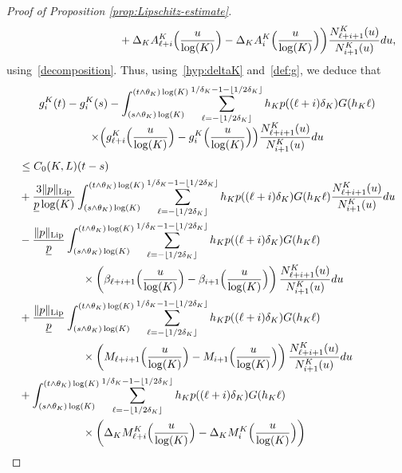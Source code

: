 \documentclass[10pt]{amsart}
\theoremstyle{plain}
\theoremstyle{remark}
\begin{document}
\begin{proof}[Proof of Proposition \ref{prop:Lipschitz-estimate}]
{\begin{align*}
& \hspace{3.5cm}+ \Delta_KA^K_{\ell+i}\Bigl(\frac{u}{\log(K)}\Bigr)-\Delta_KA^K_{i}\Bigl(\frac{u}{\log(K)}\Bigr)\biggr) \frac{N^K_{\ell+i+1}(u)}{N^K_{i+1}(u)}du ,
\end{align*}
using~\eqref{decomposition}. Thus, using~\eqref{hyp:deltaK} and~\eqref{def:g}, we deduce that\vspace*{-.5\baselineskip}
\begin{multline*}
g^K_{i}(t)-g^K_{i}(s)
- \int_{(s\wedge\theta_K)\log(K)}^{(t\wedge\theta_K)\log(K)} \sum_{\ell=-\lfloor 1/2\delta_K\rfloor}^{1/\delta_K-1-\lfloor 1/2\delta_K\rfloor}
h_{K} p((\ell+i)\delta_K)G(h_{K}\ell) \\[-5pt]
\times \Bigl(g^K_{\ell+i}\Bigl(\frac{u}{\log(K)}\Bigr)-g^K_i\Bigl(\frac{u}{\log(K)}\Bigr)\Bigr)
\frac{N^K_{\ell+i+1}(u)}{N^K_{i+1}(u)}du
\end{multline*}
\begin{align*}
&\leq C_0(K,L)(t-s)\\
& +\frac{{3}\|p\|_{\text{Lip}}}{\underline{p}\log(K)}\int_{(s\wedge\theta_K)\log(K)}^{(t\wedge\theta_K)\log(K)} \sum_{\ell=-\lfloor 1/2\delta_K\rfloor}^{1/\delta_K-1-\lfloor 1/2\delta_K\rfloor}h_Kp((\ell+i)\delta_K)G(h_K\ell)
\frac{N_{\ell+i+1}^K(u)}{N_{i+1}^K(u)}du \\
& -\frac{\|p\|_{\text{Lip}}}{\underline{p}}\int_{(s\wedge\theta_K)\log(K)}^{(t\wedge\theta_K)\log(K)} \sum_{\ell=-\lfloor 1/2\delta_K\rfloor}^{1/\delta_K-1-\lfloor 1/2\delta_K\rfloor}
h_{K} p((\ell+i)\delta_K)G(h_{K}\ell)\\
& \hspace{2cm}\times\left(\beta_{\ell+i+1}\Bigl(\frac{u}{\log(K)}\Bigr)-\beta_{i+1}\Bigl(\frac{u}{\log(K)}\Bigr)\right)
\frac{N^K_{\ell+i+1}(u)}{N^K_{i+1}(u)}du \\
& + \frac{\|p\|_{\text{Lip}}}{\underline{p}}\int_{(s\wedge\theta_K)\log(K)}^{(t\wedge\theta_K)\log(K)} \sum_{\ell=-\lfloor 1/2\delta_K\rfloor}^{1/\delta_K-1-\lfloor 1/2\delta_K\rfloor}
h_{K} p((\ell+i)\delta_K)G(h_{K}\ell)\\
& \hspace{2cm}\times\left(M_{\ell+i+1}\Bigl(\frac{u}{\log(K)}\Bigr)-M_{i+1}\Bigl(\frac{u}{\log(K)}\Bigr)\right)
\frac{N^K_{\ell+i+1}(u)}{N^K_{i+1}(u)}du\\
& + \int_{(s\wedge\theta_K)\log(K)}^{(t\wedge\theta_K)\log(K)} \sum_{\ell=-\lfloor 1/2\delta_K\rfloor}^{1/\delta_K-1-\lfloor 1/2\delta_K\rfloor}
h_{K} p((\ell+i)\delta_K)G(h_{K}\ell)\\
& \hspace{2cm}\times\left(\Delta_KM^K_{\ell+i}\Bigl(\frac{u}{\log(K)}\Bigr)-\Delta_KM^K_{i}\Bigl(\frac{u}{\log(K)}\Bigr)\right)

\end{align*}}
\end{proof}
\end{document}

